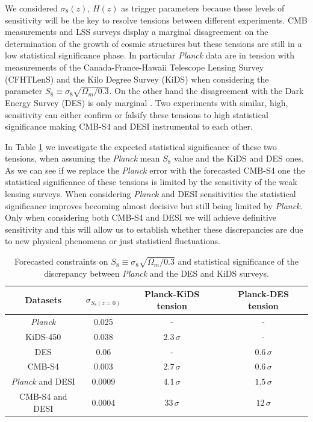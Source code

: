 We considered $\sigma_8(z)$, $H(z)$ as trigger parameters because these levels of sensitivity will be the key to resolve tensions between different experiments. 
CMB measurements and LSS surveys display a marginal disagreement on the determination of the growth of cosmic structures but these tensions are still in a low statistical significance phase.
In particular {\it Planck} data are in tension with measurements of the Canada-France-Hawaii Telescope Lensing Survey (CFHTLenS) \cite{Joudaki:2016mvz} and the Kilo Degree Survey (KiDS) \cite{Hildebrandt:2016iqg} when considering the parameter $S_8\equiv \sigma_8\sqrt{\Omega_m/0.3}$. 
On the other hand the disagreement with the Dark Energy Survey (DES) is only marginal \cite{Abbott:2015swa}.
Two experiments with similar, high, sensitivity can either confirm or falsify these tensions to high statistical significance making CMB-S4 and DESI instrumental to each other.

In Table \ref{table:ForecastTensionS8} we investigate the expected statistical significance of these two tensions, when assuming the {\it Planck} mean $S_8$ value and the KiDS and DES ones. As we can see if we replace the {\it Planck} error with the forecasted CMB-S4 one the statistical significance of these tensions is limited by the sensitivity of the weak lensing surveys. When considering {\it Planck} and DESI sensitivities the statistical significance improves becoming almost decisive but still being limited by {\it Planck}. Only when considering both CMB-S4 and DESI we will achieve definitive sensitivity and this will allow us to establish whether these discrepancies are due to new physical phenomena or just statistical fluctuations.

\begin{table}[t!]
\begin{center}
\begin{tabular}{|c|c|c|c|} 
\hline
    				  Datasets 			& $\sigma_{S_8(z=0)}$  & Planck-KiDS tension & Planck-DES tension  \\
				  \hline
{\it Planck}  		& 		0.025	& - & -	\\
\hline
KiDS-450 		& 			0.038  	& $2.3 \, \sigma$ & -	\\
\hline
DES             &			0.06	 & - & $0.6 \, \sigma$	\\
\hline
CMB-S4       &			0.003  & 	$2.7 \, \sigma$ & $0.6 \, \sigma$	\\
\hline
{\it Planck} and DESI            &   0.0009	& 	$4.1 \, \sigma$ & $1.5 \, \sigma$	 \\
\hline
CMB-S4 and DESI  &   0.0004	 & 	$33 \, \sigma$ & $12 \, \sigma$			\\
\hline
\end{tabular}
\caption{Forecasted constraints on $S_8\equiv \sigma_8\sqrt{\Omega_m/0.3}$ and statistical significance of the discrepancy between {\it Planck} and the DES and KiDS surveys.}
\label{table:ForecastTensionS8}
\end{center}
\end{table}

